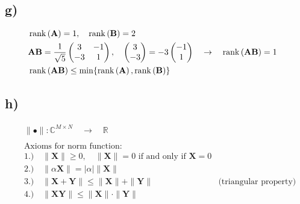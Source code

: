 \subsection*{g) }
\begin{align*}
	&\operatorname{rank}\left(\mathbf{A}\right)=1,\quad\operatorname{rank}\left(\mathbf{B}\right)=2& \\
	&\mathbf{AB}=\frac{1}{\sqrt{5}}
	\begin{pmatrix}
	3 & -1 \\
	-3 & 1
	\end{pmatrix},\quad
	\begin{pmatrix}3\\-3\end{pmatrix}=-3\begin{pmatrix}-1\\1\end{pmatrix}\quad\rightarrow\quad\operatorname{rank}\left(\mathbf{AB}\right)=1& \\
	&\operatorname{rank}\left(\mathbf{AB}\right)\le\min\{\operatorname{rank}\left(\mathbf{A}\right), \operatorname{rank}\left(\mathbf{B}\right)\}&
\end{align*}

\subsection*{h) }
\begin{align*}
	&\|\bullet\|: \mathbb{C}^{M\times N}\quad\rightarrow\quad\mathbb{R}& \\\\
	&\text{Axioms for norm function:}&\\
	&1.)\quad\|\mathbf{X}\|\ge 0,\quad\|\mathbf{X}\|=0 \text{ if and only if }\mathbf{X}=0& \\
	&2.)\quad\|\alpha\mathbf{X}\|=\left|\alpha\right|\|\mathbf{X}\|& \\
	&3.)\quad\|\mathbf{X+Y}\|\le\|\mathbf{X}\|+\|\mathbf{Y}\|& \text{(triangular property)} \\
	&4.)\quad\|\mathbf{XY}\|\le\|\mathbf{X}\|\cdot\|\mathbf{Y}\|&
\end{align*}

